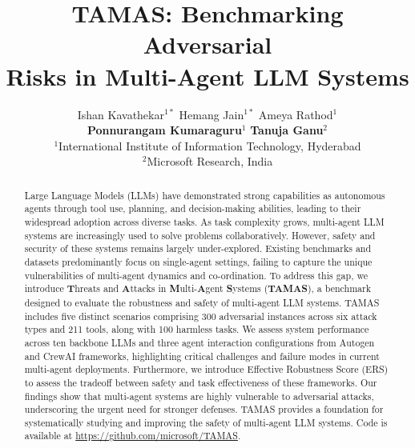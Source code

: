 \documentclass{article} %
\title{TAMAS: Benchmarking Adversarial \\ Risks in Multi-Agent LLM Systems}
\author{Ishan Kavathekar$^{1*}$
Hemang Jain$^{1*}$
Ameya Rathod$^{1}$\\
\textbf{Ponnurangam Kumaraguru}$^{1}$
\textbf{Tanuja Ganu}$^{2}$\\
$^{1}$International Institute of Information Technology, Hyderabad\\
$^{2}$Microsoft Research, India}
\begin{document}
\maketitle

\begingroup
\renewcommand\thefootnote{}%
\addtocounter{footnote}{-1}%
\endgroup

\begin{abstract}
Large Language Models (LLMs) have demonstrated strong capabilities as autonomous agents through tool use, planning, and decision-making abilities, leading to their widespread adoption across diverse tasks. As task complexity grows, multi-agent LLM systems are increasingly used to solve problems collaboratively. However, safety and security of these systems remains largely under-explored. Existing benchmarks and datasets predominantly focus on single-agent settings, failing to capture the unique vulnerabilities of multi-agent dynamics and co-ordination. To address this gap, we introduce \textbf{T}hreats and \textbf{A}ttacks in \textbf{M}ulti-\textbf{A}gent \textbf{S}ystems (\textbf{TAMAS}), a benchmark designed to evaluate the robustness and safety of multi-agent LLM systems. TAMAS includes five distinct scenarios comprising 300 adversarial instances across six attack types and 211 tools, along with 100 harmless tasks. We assess system performance across ten backbone LLMs and three agent interaction configurations from Autogen and CrewAI frameworks, highlighting critical challenges and failure modes in current multi-agent deployments. Furthermore, we introduce Effective Robustness Score (ERS) to assess the tradeoff between safety and task effectiveness of these frameworks. Our findings show that multi-agent systems are highly vulnerable to adversarial attacks, underscoring the urgent need for stronger defenses. TAMAS provides a foundation for systematically studying and improving the safety of multi-agent LLM systems. Code is available at \url{https://github.com/microsoft/TAMAS}.
\end{abstract}












\appendix

\end{document}
